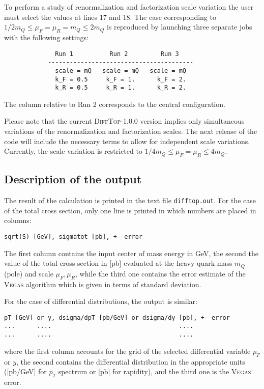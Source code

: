\documentclass[11pt]{article}
\begin{document}
{To perform a study of renormalization and factorization scale variation 
the user must select the values at lines 17 and 18. 
The case corresponding to $1/2 m_Q \leq \mu_F = \mu_R = m_Q \leq 2 m_Q $ 
is reproduced by launching three separate jobs with the following settings:
\begin{verbatim}
              Run 1          Run 2         Run 3
            ----------------------------------------
              scale = mQ   scale = mQ   scale = mQ     
              k_F = 0.5     k_F = 1.      k_F = 2. 
              k_R = 0.5     k_R = 1.      k_R = 2.
\end{verbatim}
The column relative to Run 2 corresponds to the central configuration. 

Please note that the current \textsc{DiffTop}-1.0.0 version implies only 
simultaneous variations of the renormalization and factorization scales.
The next release of the code will include the necessary terms 
to allow for independent scale variations.
Currently, the scale variation is restricted to $1/4 m_Q \leq \mu_F=\mu_R \leq 4 m_Q$.









\subsection{Description of the output}\label{sec:Description of the output}

The result of the calculation is printed in the text file \texttt{difftop.out}. 
For the case of the total cross section, only one line is printed in which numbers are placed in columns: 
\begin{verbatim}
sqrt(S) [GeV], sigmatot [pb], +- error
\end{verbatim}
The first column contains the input center of mass energy in GeV, 
the second the value of the total cross section in [pb] evaluated at the 
heavy-quark mass $m_Q$ (pole) and scale $\mu_F,\mu_R$,
while the third one contains the error estimate of the \textsc{Vegas} algorithm 
which is given in terms of standard deviation.

For the case of differential distributions, the output is similar:  
\begin{verbatim}
pT [GeV] or y, dsigma/dpT [pb/GeV] or dsigma/dy [pb], +- error
...      ....                                   ....
...      ....                                   .... 
\end{verbatim}
where the first column accounts for the grid of the selected differential variable $p_T$ or $y$,
the second contains the differential distribution in the appropriate units ([pb/GeV] for $p_T$ spectrum 
or [pb] for rapidity), and the third one is the \textsc{Vegas} error.  

}
\end{document}
